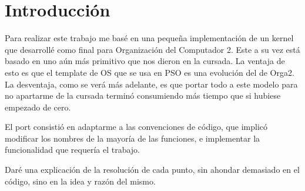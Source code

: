 \section{Introducción}

Para realizar este trabajo me basé en una pequeña implementación de un kernel
que desarrollé como final para Organización del Computador 2. Este a su vez
está basado en uno aún más primitivo que nos dieron en la cursada. La ventaja
de esto es que el template de OS que se usa en PSO es una evolución del de
Orga2. La desventaja, como se verá más adelante, es que portar todo a este
modelo para no apartarme de la cursada terminó consumiendo más tiempo que si
hubiese empezado de cero.

El port consistió en adaptarme a las convenciones de código, que implicó
modificar los nombres de la mayoría de las funciones, e implementar la
funcionalidad que requería el trabajo. 

Daré una explicación de la resolución de cada punto, sin ahondar demasiado en
el código, sino en la idea y razón del mismo.
